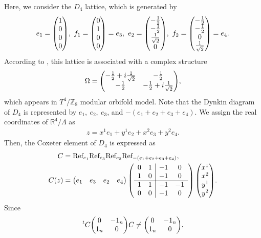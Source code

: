 \documentclass[11pt]{article}
\begin{document}
Here, we consider the $D_4$ lattice, which is generated by
\begin{align}
    e_1=\mqty(1 \\ 0 \\ 0 \\ 0),~
    f_1=\mqty(0 \\ 1 \\ 0 \\ 0)=e_3,~
    e_2=\mqty(-\frac{1}{2} \\ -\frac{1}{2} \\ \frac{1}{\sqrt{2}}   \\ 0),~
    f_2=\mqty(-\frac{1}{2} \\  -\frac{1}{2}  \\ 0 \\ \frac{1}{\sqrt{2}} )=e_4.
\end{align}
According to \cite{Kikuchi:2022psj}, this lattice is associated with a complex structure 
\begin{align}
    \Omega= \mqty( -\frac{1}{2} +i \frac{1}{\sqrt{2}} &  -\frac{1}{2}  \\ -\frac{1}{2}  & -\frac{1}{2} +i \frac{1}{\sqrt{2}} ),
\end{align}
which appears in $T^4/\mathbb{Z}_8$ modular orbifold model. Note that the Dynkin diagram of $D_4$ is represented by $e_1,~ e_2,~e_3$, and $-(e_1+e_2+e_3+e_4)$. We assign the real coordinates of $\mathbb{R}^4/\Lambda$ as
\begin{align}
    z=x^1e_1 +y^1 e_2+ x^2 e_3 +y^2e_4.
\end{align}
Then, the Coxeter element of $D_4$ is expressed as
\begin{align}
C&= \text{Ref}_{e_1}  \text{Ref}_{e_3} \text{Ref}_{e_2} \text{Ref}_{-(e_1+e_2+e_3+e_4)} ,\\
    C(z)&=\mqty(e_1 & e_3 & e_2 & e_4)\left(\begin{array}{cc|cc}
        0 & 1 & -1 & 0 \\ 
        1 & 0 & -1 & 0 \\ \cline{1-4}
        1 & 1 & -1 & -1 \\
        0 & 0 & -1& 0  
        \end{array}\right) \mqty(x^1 \\ x^2 \\ y^1 \\ y^2).
\end{align}
Since
\begin{align}
    {}^t C \mqty( 0  & -1_n \\ 1_n & 0) C \neq   \mqty( 0  & -1_n \\ 1_n & 0),
\end{align}
\end{document}
